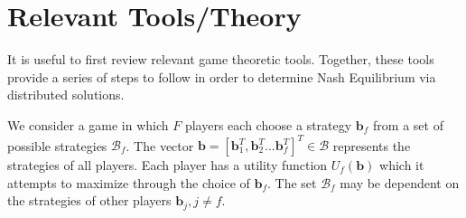 \documentclass[12pt,a4paper]{report}
\begin{document}
\section{Relevant Tools/Theory}\label{tools}
It is useful to first review relevant game theoretic tools. Together, these tools provide a series of steps to follow in order to determine Nash Equilibrium via distributed solutions. 
\par
We consider a game in which $F$ players each choose a strategy $\mathbf{b}_{f}$ from a set of possible strategies $\mathcal{B}_f$. The vector $\mathbf{b}=[\mathbf{b}_{1}^T, \mathbf{b}_2^T... \mathbf{b}_{f}^T]^T \in \mathcal{B}$ represents the strategies of all players. Each player has a utility function $U_f(\mathbf{b})$ which it attempts to maximize through the choice of $\mathbf{b}_{f}$. The set $\mathcal{B}_f$ may be dependent on the strategies of other players $\mathbf{b}_{j}, j \neq f $.
\end{document}
